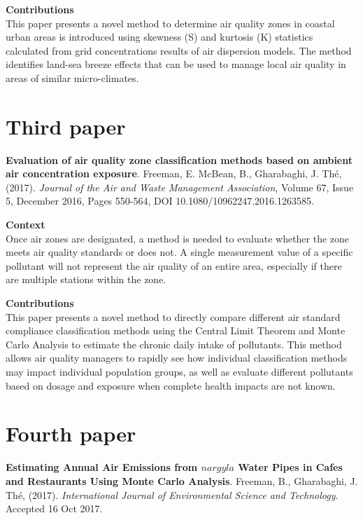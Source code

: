 \vspace{5mm}
\noindent
\textbf{Contributions}\\
\noindent
This paper presents a novel method to determine air quality zones in coastal urban areas is introduced using skewness (S) and kurtosis (K) statistics calculated from grid concentrations results of air dispersion models.  The method identifies land-sea breeze effects that can be used to manage local air quality in areas of similar micro-climates.

\section{Third paper}

\textbf{Evaluation of air quality zone classification methods based on ambient air concentration exposure}. Freeman, E. McBean, B., Gharabaghi, J.  Th\'e, (2017). \textit{Journal of the Air and Waste Management Association}, Volume 67, Issue 5, December 2016, Pages 550-564, DOI 10.1080/10962247.2016.1263585.

\vspace{5mm}
\noindent
\textbf{Context}\\
\noindent
Once air zones are designated, a method is needed to evaluate whether the zone meets air quality standards or does not. A single measurement value of a specific pollutant will not represent the air quality of an entire area, especially if there are multiple stations within the zone. 

\vspace{5mm}
\noindent
\textbf{Contributions}\\
\noindent
This paper presents a novel method to directly compare different air standard compliance classification methods using the Central Limit Theorem and Monte Carlo Analysis to estimate the chronic daily intake of pollutants. This method allows air quality managers to rapidly see how individual classification methods may impact individual population groups, as well as evaluate different pollutants based on dosage and exposure when complete health impacts are not known.

\section{Fourth paper}

\textbf{Estimating Annual Air Emissions from $nargyla$ Water Pipes in Cafes and Restaurants Using Monte Carlo Analysis}. Freeman, B., Gharabaghi, J.  Th\'e, (2017). \textit{International Journal of Environmental Science and Technology}. Accepted 16 Oct 2017.

